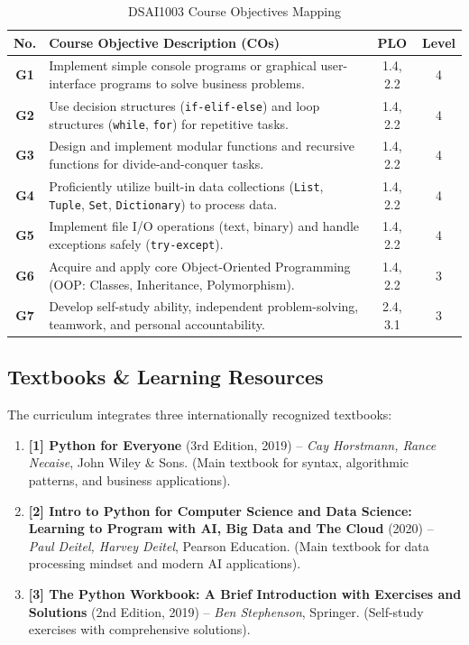 \documentclass[11pt,a4paper]{article}
\begin{document}
\begin{table}[htbp]
\centering
\small
\begin{tabularx}{\textwidth}{@{}c X c c@{}}
\toprule
\textbf{No.} & \textbf{Course Objective Description (COs)} & \textbf{PLO} & \textbf{Level} \\
\midrule
\textbf{G1} & Implement simple console programs or graphical user-interface programs to solve business problems. & 1.4, 2.2 & 4 \\
\textbf{G2} & Use decision structures (\texttt{if-elif-else}) and loop structures (\texttt{while}, \texttt{for}) for repetitive tasks. & 1.4, 2.2 & 4 \\
\textbf{G3} & Design and implement modular functions and recursive functions for divide-and-conquer tasks. & 1.4, 2.2 & 4 \\
\textbf{G4} & Proficiently utilize built-in data collections (\texttt{List}, \texttt{Tuple}, \texttt{Set}, \texttt{Dictionary}) to process data. & 1.4, 2.2 & 4 \\
\textbf{G5} & Implement file I/O operations (text, binary) and handle exceptions safely (\texttt{try-except}). & 1.4, 2.2 & 4 \\
\textbf{G6} & Acquire and apply core Object-Oriented Programming (OOP: Classes, Inheritance, Polymorphism). & 1.4, 2.2 & 3 \\
\textbf{G7} & Develop self-study ability, independent problem-solving, teamwork, and personal accountability. & 2.4, 3.1 & 3 \\
\bottomrule
\end{tabularx}
\caption{DSAI1003 Course Objectives Mapping}
\end{table}

\subsection{Textbooks \& Learning Resources}
The curriculum integrates three internationally recognized textbooks:
\begin{enumerate}[leftmargin=1.5em, itemsep=3pt]
    \item \textbf{[1] Python for Everyone} (3rd Edition, 2019) -- \textit{Cay Horstmann, Rance Necaise}, John Wiley \& Sons. (Main textbook for syntax, algorithmic patterns, and business applications).
    \item \textbf{[2] Intro to Python for Computer Science and Data Science: Learning to Program with AI, Big Data and The Cloud} (2020) -- \textit{Paul Deitel, Harvey Deitel}, Pearson Education. (Main textbook for data processing mindset and modern AI applications).
    \item \textbf{[3] The Python Workbook: A Brief Introduction with Exercises and Solutions} (2nd Edition, 2019) -- \textit{Ben Stephenson}, Springer. (Self-study exercises with comprehensive solutions).
\end{enumerate}
\end{document}
